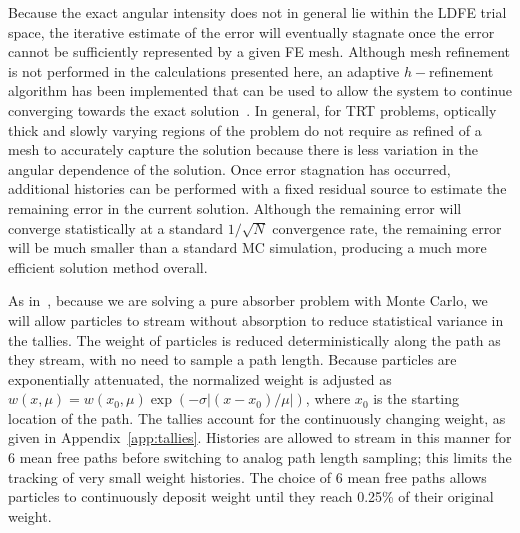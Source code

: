 \documentclass{mc2013}
\begin{document}
Because the exact angular intensity does not in general lie within the LDFE trial space, the
iterative estimate of the error will eventually stagnate once the error cannot be sufficiently
represented by a given FE mesh.  Although mesh refinement is not performed in the
calculations presented here, an adaptive $h-$refinement algorithm has been
implemented that can be used to allow the system to continue converging towards the
exact solution~\cite{jake,ans_2014}. In general, for TRT problems, optically thick and slowly varying
regions of the problem do not require as refined of a mesh to accurately capture the
solution because there is less variation in the angular dependence of the solution.
Once error stagnation has occurred, additional histories can be performed with a
fixed residual source to estimate the remaining error in the current solution.  Although the remaining error will
converge statistically at a standard $1/\sqrt{N}$ convergence rate, the remaining
error will be much smaller than a standard MC simulation, producing a much more
efficient solution method overall.



As in~\cite{park}, because we are solving a pure absorber problem with Monte Carlo, we will allow
particles to stream without absorption to reduce statistical 
variance in the tallies.  The weight of particles is reduced deterministically along
the path as they stream, with no need to sample a path length.  Because particles are exponentially attenuated, the normalized weight is
adjusted as $w(x,\mu) = w(x_0,\mu)\exp(-\sigma|(x-x_0)/\mu|)$, where $x_0$ is the starting location of the path.  The tallies account
for the continuously changing weight, as given in Appendix~\ref{app:tallies}. Histories are allowed to stream in this manner for 6 mean free paths
before switching to analog path length sampling; this limits the tracking of very small weight histories. The choice of 6 mean free paths allows particles to 
continuously deposit weight until they reach 0.25\% of their original weight.
\end{document}
